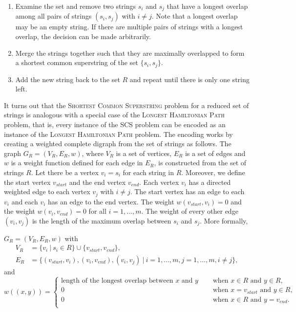 \documentclass[english,twoside,censored,csm,algorithms-track-2020]{HYthesisML}
\theoremstyle{plain}
\theoremstyle{definition}
\numberwithin{testexample}{chapter}
\begin{document}
\begin{enumerate}
\item Examine the set and remove two strings $s_i$ and $s_j$ that have a longest overlap among all pairs of strings $(s_i, s_j)$ with $i\neq j$. Note that a longest overlap may be an empty string. If there are multiple pairs of strings with a longest overlap, the decision can be made arbitrarily.
\item Merge the strings together such that they are maximally overlapped to form a shortest common superstring of the set $\{s_i, s_j\}$.
  \item Add the new string back to the set $R$ and repeat until there is only one string left.
\end{enumerate}

It turns out that the \textsc{Shortest Common Superstring} problem for a reduced set of strings is
analogous with a special case of
the \textsc{Longest Hamiltonian Path} problem, that is, every instance of the SCS problem can be encoded
as an instance of the \textsc{Longest Hamiltonian Path} problem. The encoding works by creating a weighted
complete digraph from the set of strings as follows. 
The graph $G_R=(V_R,E_R,w)$, where $V_R$ is a set of vertices, $E_R$ is a set of edges and $w$ is a
 weight function defined for each edge in $E_R$, is constructed from the set of strings $R$.
Let there be a vertex $v_i=s_i$ for each string in $R$. Moreover, we define the start vertex
$v_{start}$ and the end vertex $v_{end}$. Each vertex $v_i$ has a directed weighted edge to each vertex
$v_j$ with $i\neq j$. The start vertex has an edge to each $v_i$ and each $v_i$ has an edge to the
end vertex. The weight $w(v_{start}, v_i) = 0$ and the weight $w(v_i, v_{end}) = 0$ for all $i=1,...,m$.
The weight of every other edge $(v_i, v_j)$ is the length of the maximum overlap between $s_i$ and $s_j$.
More formally,

$G_R=(V_R,E_R,w)$ with
\begin{align*}
  V_R &= \{v_i~|~s_i\in R\} \cup \{v_{start},v_{end}\}, \\
  E_R &= \{(v_{start},v_i), (v_i,v_{end}), (v_i,v_j)~|~i=1,...,m, j=1,...,m, i\neq j\},
\end{align*}
and
\[   
w((x,y)) = 
     \begin{cases}
       \text{length of the longest overlap between } x \text{ and } y &\quad\text{ when } x\in R \text{ and } y\in R,  \\
       0 &\quad\text{ when } x=v_{start} \text{ and } y\in R, \\
       0 &\quad\text{ when } x\in R \text{ and } y=v_{end}. \\
     \end{cases}
     \]
\end{document}
